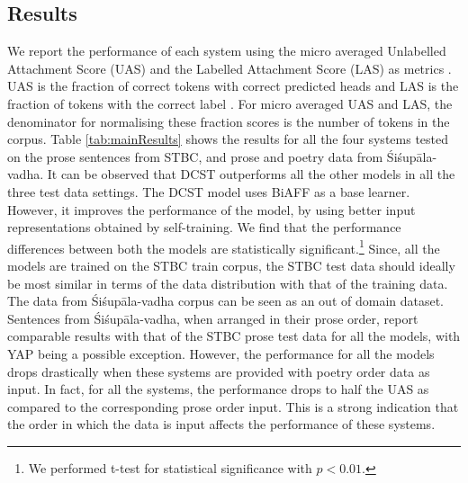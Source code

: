\documentclass[11pt]{article}
\begin{document}
\subsection{Results}
 We report the performance of each system using the micro averaged Unlabelled Attachment Score (UAS) and the Labelled Attachment Score (LAS) as metrics \cite{nivre-fang-2017-universal}. UAS is the fraction of correct tokens with correct predicted heads and LAS is the fraction of tokens with the correct label \cite{mcdonald-nivre-2011-analyzing}. For micro averaged UAS and LAS, the denominator for normalising these fraction scores is the number of tokens in the corpus.  Table \ref{tab:mainResults} shows the results for all the four systems tested on the prose sentences from STBC, and prose and poetry data from Śiśupāla-vadha. It can be observed that DCST outperforms all the other models in all the three test data settings. The DCST model uses BiAFF as a base learner. However, it improves the performance of the model, by using better input representations obtained by self-training. We find that the performance differences between both the models are statistically significant.\footnote{We performed t-test for statistical significance with $p < 0.01$.}  Since, all the models are trained on the STBC train corpus, the STBC test data should ideally be most similar in terms of the data distribution with that of the training data. The data from Śiśupāla-vadha corpus can be seen as an out of domain dataset. Sentences from Śiśupāla-vadha, when arranged in their prose order, report comparable results  with that of the STBC prose test data for all the models, with YAP being a possible exception. However, the performance for all the models drops drastically when these systems are provided with poetry order data as input. In fact, for all the systems, the performance drops to half the UAS as compared to the corresponding prose order input. This is a strong indication that the order in which the data is input affects the performance of these systems. 
 
  




    
\end{document}
